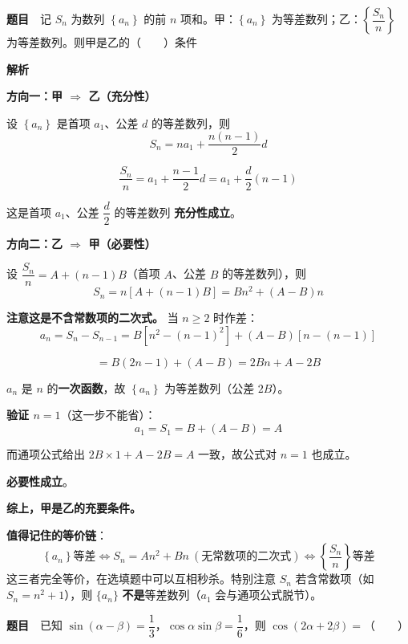 \par\medskip


\textbf{题目}　记 $S_n$ 为数列 $\left\{a_n\right\}$ 的前 $n$ 项和。甲：$\left\{a_n\right\}$ 为等差数列；乙：$\left\{\dfrac{S_n}n\right\}$ 为等差数列。则甲是乙的（　　）条件

\textbf{解析}

\textbf{方向一：甲 $\Rightarrow$ 乙（充分性）}

设 $\left\{a_n\right\}$ 是首项 $a_1$、公差 $d$ 的等差数列，则
\[S_n=na_1+\frac{n(n-1)}2d\]

\[\frac{S_n}n=a_1+\frac{n-1}2d=a_1+\frac d2(n-1)\]

这是首项 $a_1$、公差 $\dfrac d2$ 的等差数列  \textbf{充分性成立}。

\textbf{方向二：乙 $\Rightarrow$ 甲（必要性）}

设 $\dfrac{S_n}n=A+(n-1)B$（首项 $A$、公差 $B$ 的等差数列），则
\[S_n=n\left[A+(n-1)B\right]=Bn^{2}+(A-B)n\]

\textbf{注意这是不含常数项的二次式。} 当 $n\ge2$ 时作差：
\[a_n=S_n-S_{n-1}=B\left[n^{2}-(n-1)^{2}\right]+(A-B)\left[n-(n-1)\right]\]

\[=B(2n-1)+(A-B)=2Bn+A-2B\]

$a_n$ 是 $n$ 的\textbf{一次函数}，故 $\left\{a_n\right\}$ 为等差数列（公差 $2B$）。

\textbf{验证 $n=1$}（这一步不能省）：
\[a_1=S_1=B+(A-B)=A\]

而通项公式给出 $2B\times1+A-2B=A$  一致，故公式对 $n=1$ 也成立。

\textbf{必要性成立}。

\textbf{综上，甲是乙的充要条件。}


\begin{gktip}
\textbf{值得记住的等价链}：
\[\left\{a_n\right\}\text{等差}\iff S_n=An^{2}+Bn\ (\text{无常数项的二次式})\iff\left\{\frac{S_n}n\right\}\text{等差}\]
这三者完全等价，在选填题中可以互相秒杀。特别注意 $S_n$ 若含常数项（如 $S_n=n^2+1$），则 $\{a_n\}$ \textbf{不是}等差数列（$a_1$ 会与通项公式脱节）。
\end{gktip}

\par\medskip


\textbf{题目}　已知 $\sin(\alpha-\beta)=\dfrac13$，$\cos\alpha\sin\beta=\dfrac16$，则 $\cos(2\alpha+2\beta)=$（　　）

